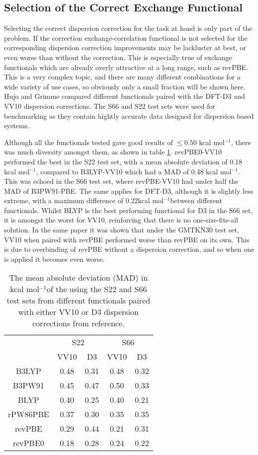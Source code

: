 \documentclass[10pt,a4paper,twocolumn,twoside]{extarticle}
\newcommand{\kcal}{kcal mol\(^{-1}\)}
\begin{document}
	\subsection{Selection of the Correct Exchange Functional}
	Selecting the correct dispersion correction for the task at hand is only part of the problem. If the correction exchange-correlation functional is not selected for the corresponding dispersion correction improvements may be lackluster at best, or even worse than without the correction. This is especially true of exchange functionals which are already overly attractive at a long range, such as revPBE. This is a very complex topic, and there are many different combinations for a wide variety of use cases, so obviously only a small fraction will be shown here. 
	Hujo and Grimme compared different functionals paired with the DFT-D3 and VV10 dispersion corrections.\cite{Grimme2011-D3-VV10-Compairons} The S66\cite{s66a,s66b} and S22\cite{s22} test sets were used for benchmarking as they contain hightly accurate data designed for dispersion based systems. 

	Although all the functionals tested gave good results of $\leq0.50$ \kcal, there was much diversity amongst them, as shown in table \ref{tab:VV10D3}. revPBE0-VV10 performed the best in the S22 test set, with a mean absolute deviation of 0.18 \kcal, compared to B3LYP-VV10 which had a MAD of 0.48 \kcal. This was echoed in the S66 test set, where revPBE-VV10 had under half the MAD of B3PW91-PBE. The same applies for DFT-D3, although it is slightly less extreme, with a maximum difference of 0.22\kcal between different functionals. Whilst BLYP is the best performing functional for D3 in the S66 set, it is amongst the worst for VV10, reinforcing that there is no one-size-fits-all solution.
	In the same paper it was shown that under the GMTKN30 test set, VV10 when paired with revPBE performed worse than revPBE on its own. This is due to overbinding of revPBE without a dispersion correction, and so when one is applied it becomes even worse. 

	\begin{table}
		\centering
		\begin{tabular}[]{c|c c c c}
					& \multicolumn{2}{c}{S22} & \multicolumn{2}{c}{S66}\\
					& VV10 & D3 & VV10 & D3\\
					\hline
			B3LYP   & 0.48 & 0.31 & 0.48 & 0.32\\
			B3PW91  & 0.45 & 0.47 & 0.50 & 0.33\\
			BLYP    & 0.40 & 0.25 & 0.40 & 0.21\\
			rPW86PBE& 0.37 & 0.30 & 0.35 & 0.35\\
			revPBE  & 0.29 & 0.44 & 0.21 & 0.31\\
			revPBE0 & 0.18 & 0.28 & 0.24 & 0.22\\
		\end{tabular}
		\caption{The mean absolute deviation (MAD) in \kcal of the using the S22 and S66 test sets from different functionals paired with either VV10 or D3 dispersion corrections from reference.\cite{Grimme2011-VV10-LDA-GGA-Pairing}}
		\label{tab:VV10D3}
	\end{table}
\end{document}
